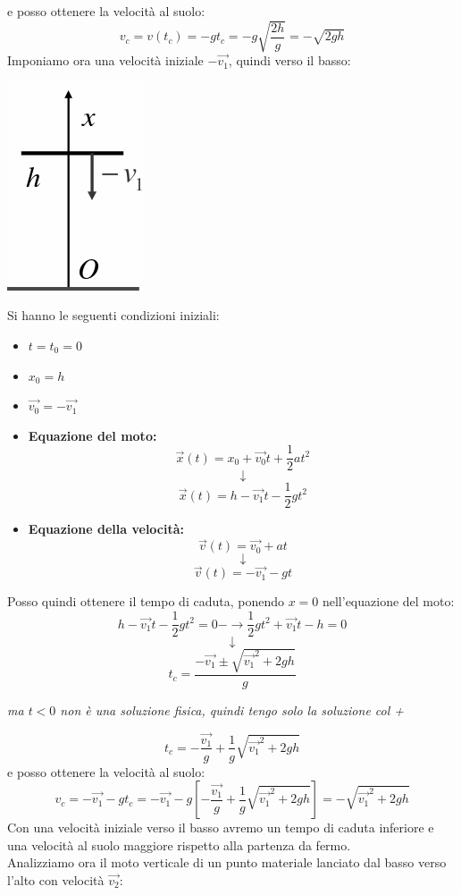\documentclass[a4paper,12pt, oneside]{book}
\begin{document}
e posso ottenere la velocità al suolo:
$$v_c=v(t_c)=-g t_c=-g \sqrt{\frac{2 h}{g}}=-\sqrt{2 g h}$$
Imponiamo ora una velocità iniziale $-\vec{v_1}$, quindi verso il basso:
\begin{center}
\includegraphics[scale=0.4]{img/vert2.png}
\end{center} 
Si hanno le seguenti condizioni iniziali:
\begin{itemize}
\item $t=t_0=0$
\item $x_0=h$
\item $\vec{v_0}=-\vec{v_1}$
\end{itemize}
\begin{itemize}
\item \textbf{Equazione del moto:}
$$\vec{x}(t)=x_0+\vec{v_0} t+\frac{1}{2} a  t^2$$
$$\downarrow$$
$$\vec{x}(t)=h-\vec{v_1}t-\frac{1}{2} g t^2$$
\item \textbf{Equazione della velocità:}
$$\vec{v}(t)=\vec{v_0}+a t$$
$$\downarrow$$
$$\vec{v}(t)=-\vec{v_1}-gt$$
\end{itemize}
Posso quindi ottenere il tempo di caduta, ponendo $x=0$ nell'equazione del moto:
$$h-\vec{v_1}t-\frac{1}{2} g t^2=0-\rightarrow \frac{1}{2} g t^2 +\vec{v_1}t-h=0$$
$$\downarrow$$
$$t_c=\frac{-\vec{v_1}\pm \sqrt{\vec{v_1}^2+2gh}}{g}$$
\begin{center}
\textit{ma $t<0$ non è una soluzione fisica, quindi tengo solo la soluzione col +}
\end{center}
$$t_c=-\frac{\vec{v_1}}{g}+\frac{1}{g}\sqrt{\vec{v_1}^2+2gh}$$
e posso ottenere la velocità al suolo:
$$v_c=-\vec{v_1}-gt_c=-\vec{v_1}-g\left[-\frac{\vec{v_1}}{g}+\frac{1}{g}\sqrt{\vec{v_1}^2+2gh}\right]=-\sqrt{\vec{v_1}^2+2gh}$$
Con una velocità iniziale verso il basso avremo un tempo di caduta inferiore e una velocità al suolo maggiore rispetto alla partenza da fermo.\\
Analizziamo ora il moto verticale di un punto materiale lanciato dal basso verso l'alto con velocità $\vec{v_2}$:
\end{document}
